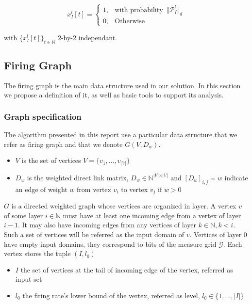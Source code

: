\documentclass[a4paper, 11pt]{article}
\begin{document}
\begin{equation*}
x_I^l[t] = \begin{cases} 1, & \text{with probability }\ \Vert \mathcal{P}_I^l \Vert_{d} \\ 0, & \text{Otherwise} \end{cases}
\end{equation*}

with $\{ x_I^l[t] \}_{t\in \mathbb{N}}$ 2-by-2 independant.

\subsection{Firing Graph}
The firing graph is the main data structure used in our solution. In this section we propose a definition of it, as well as basic tools to support its analysis.
  
\subsubsection*{Graph specification}
The algorithm presented in this report use a particular data structure that we refer as firing graph and that we denote $G(V, D_w)$. 

\begin{itemize}
\item $V$ is the set of vertices $V = \lbrace v_1, \ldots, v_{\vert V \vert} \rbrace$
\item $D_w$ is the weighted direct link matrix, $D_w \in \mathbb{N}^{\vert V \vert \times \vert V \vert}$ and $\left[ D_w \right]_{i, j} = w$ indicate an edge of weight $w$ from vertex $v_i$ to vertex $v_j$ if $w > 0$  
\end{itemize}

$G$ is a directed weighted graph whose vertices are organized in layer. A vertex $v$ of some layer $i \in \mathbb{N}$ must have at least one incoming edge from a vertex of layer $i-1$. It may also have incoming edges from any vertices of layer $k \in \mathbb{N}, k < i$. Such a set of vertices will be referred as the input domain of $v$. Vertices of layer $0$ have empty input domains, they correspond to bits of the measure grid $\mathcal{G}$. Each vertex stores the tuple $(I, l_0)$

\begin{itemize}
\item $I$ the set of vertices at the tail of incoming edge of the vertex, referred as input set
\item $l_0$ the firing rate's lower bound of the vertex, referred as level, $l_0 \in \lbrace 1, \ldots, \vert I \vert \rbrace$ 
\end{itemize}
\end{document}
